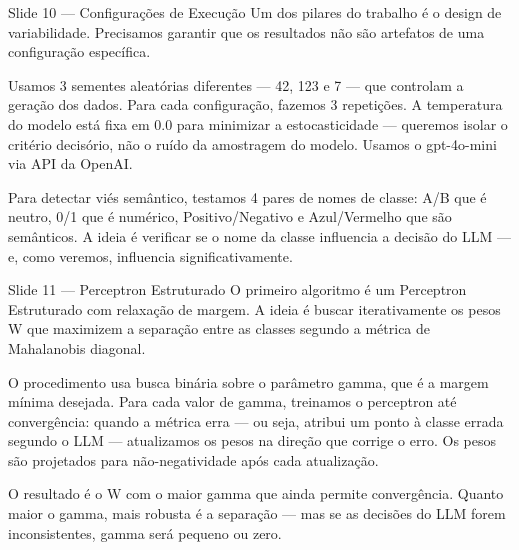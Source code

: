 \documentclass[aspectratio=169,11pt]{beamer}
\begin{document}
\begin{frame}{Slide 10 --- Configurações de Execução}
\small
Um dos pilares do trabalho é o design de variabilidade. Precisamos garantir que os resultados não são artefatos de uma configuração específica.

Usamos 3 sementes aleatórias diferentes --- 42, 123 e 7 --- que controlam a geração dos dados. Para cada configuração, fazemos 3 repetições. A temperatura do modelo está fixa em 0.0 para minimizar a estocasticidade --- queremos isolar o critério decisório, não o ruído da amostragem do modelo. Usamos o gpt-4o-mini via API da OpenAI.

Para detectar viés semântico, testamos 4 pares de nomes de classe: A/B que é neutro, 0/1 que é numérico, Positivo/Negativo e Azul/Vermelho que são semânticos. A ideia é verificar se o nome da classe influencia a decisão do LLM --- e, como veremos, influencia significativamente.
\end{frame}

\begin{frame}{Slide 11 --- Perceptron Estruturado}
\small
O primeiro algoritmo é um Perceptron Estruturado com relaxação de margem. A ideia é buscar iterativamente os pesos W que maximizem a separação entre as classes segundo a métrica de Mahalanobis diagonal.

O procedimento usa busca binária sobre o parâmetro gamma, que é a margem mínima desejada. Para cada valor de gamma, treinamos o perceptron até convergência: quando a métrica erra --- ou seja, atribui um ponto à classe errada segundo o LLM --- atualizamos os pesos na direção que corrige o erro. Os pesos são projetados para não-negatividade após cada atualização.

O resultado é o W com o maior gamma que ainda permite convergência. Quanto maior o gamma, mais robusta é a separação --- mas se as decisões do LLM forem inconsistentes, gamma será pequeno ou zero.
\end{frame}
\end{document}
